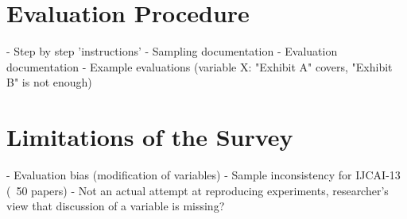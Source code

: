 \section{Evaluation Procedure}
- Step by step 'instructions'
- Sampling documentation
- Evaluation documentation
- Example evaluations (variable X: "Exhibit A" covers, "Exhibit B" is not enough)

\section{Limitations of the Survey}
- Evaluation bias (modification of variables)
- Sample inconsistency for IJCAI-13 (~50 papers)
- Not an actual attempt at reproducing experiments, researcher's view that discussion of a variable is missing?

\cleardoublepage
